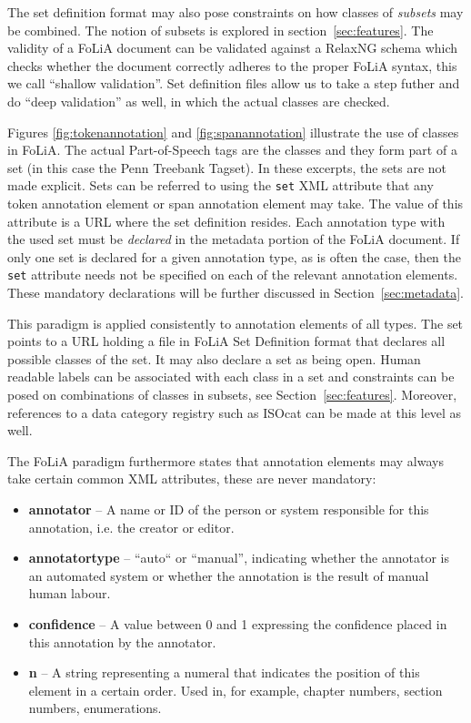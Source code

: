 \documentclass[a4paper,10pt,twoside]{article}
\begin{document}
The set definition format may also pose constraints on how classes of
\emph{subsets} may be combined. The notion of subsets is explored in 
section~\ref{sec:features}. The validity of a FoLiA document can be validated
against a RelaxNG schema which checks whether the document correctly adheres to
the proper FoLiA syntax, this we call ``shallow validation''. Set definition
files allow us to take a step futher and do ``deep validation'' as well, in
which the actual classes are checked.

Figures
\ref{fig:tokenannotation} and \ref{fig:spanannotation} illustrate the use of
classes in FoLiA. The actual Part-of-Speech tags are the classes and they form part of a
set (in this case the Penn Treebank Tagset). In these excerpts, the sets are
not made explicit. Sets can be referred to using the \texttt{set} XML attribute
that any token annotation element or span annotation element may take. The
value of this attribute is a URL where the set definition resides. Each
annotation type with the used set must be \emph{declared} in the metadata portion of
the FoLiA document. If only one set is declared for a given annotation type, as
is often the case, then the \texttt{set} attribute needs not be specified on
each of the relevant annotation elements. These mandatory declarations will be
further discussed in Section~\ref{sec:metadata}. 

This paradigm is applied consistently to annotation elements of all types. The
set points to a URL holding a file in FoLiA Set Definition format that
declares all possible classes of the set. It may also declare a set as being
open. Human readable labels can be associated with each class in a set and
constraints can be posed on combinations of classes in subsets, see
Section~\ref{sec:features}. Moreover, references to a data category registry
such as ISOcat \cite{ISOCAT} can be made at this level as well.

The FoLiA paradigm furthermore states that annotation elements may always take certain
common XML attributes, these are never mandatory:

\begin{itemize}
\item \textbf{annotator} -- A name or ID of the person or system responsible for this annotation, i.e. the creator or editor.
\item \textbf{annotatortype} -- ``auto`` or ``manual'', indicating whether the annotator is an automated system or whether the annotation is the result of manual human labour.
\item \textbf{confidence} -- A value between 0 and 1 expressing the confidence placed in this annotation by the annotator.
\item \textbf{n} -- A string representing a numeral that indicates the position
  of this element in a certain order. Used in, for example, chapter numbers, section numbers, enumerations.
\end{itemize}
\end{document}
